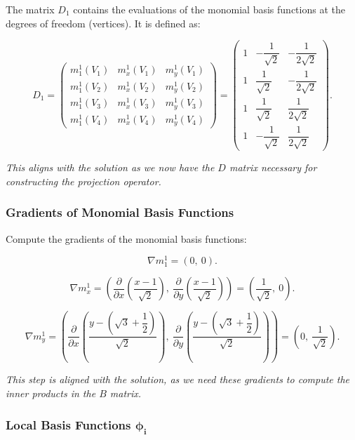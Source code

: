 \documentclass[class=article, crop=false]{standalone}
\begin{document}
The matrix $D_1$ contains the evaluations of the monomial basis functions at the degrees of freedom (vertices). It is defined as:

\[
D_1 = \begin{pmatrix}
m_1^1(V_1) & m_x^1(V_1) & m_y^1(V_1) \\
m_1^1(V_2) & m_x^1(V_2) & m_y^1(V_2) \\
m_1^1(V_3) & m_x^1(V_3) & m_y^1(V_3) \\
m_1^1(V_4) & m_x^1(V_4) & m_y^1(V_4)
\end{pmatrix} = \begin{pmatrix}
1 & -\dfrac{1}{\sqrt{2}} & -\dfrac{1}{2\sqrt{2}} \\
1 & \dfrac{1}{\sqrt{2}} & -\dfrac{1}{2\sqrt{2}} \\
1 & \dfrac{1}{\sqrt{2}} & \dfrac{1}{2\sqrt{2}} \\
1 & -\dfrac{1}{\sqrt{2}} & \dfrac{1}{2\sqrt{2}}
\end{pmatrix}.
\]

\noindent
\textit{This aligns with the solution as we now have the $D$ matrix necessary for constructing the projection operator.}

\subsubsection{Gradients of Monomial Basis Functions}

Compute the gradients of the monomial basis functions:

\[
\nabla m_1^1 = \left( 0,\ 0 \right).
\]

\[
\nabla m_x^1 = \left( \dfrac{\partial}{\partial x} \left( \dfrac{x - 1}{\sqrt{2}} \right),\ \dfrac{\partial}{\partial y} \left( \dfrac{x - 1}{\sqrt{2}} \right) \right) = \left( \dfrac{1}{\sqrt{2}},\ 0 \right).
\]

\[
\nabla m_y^1 = \left( \dfrac{\partial}{\partial x} \left( \dfrac{y - \left( \sqrt{3} + \dfrac{1}{2} \right)}{\sqrt{2}} \right),\ \dfrac{\partial}{\partial y} \left( \dfrac{y - \left( \sqrt{3} + \dfrac{1}{2} \right)}{\sqrt{2}} \right) \right) = \left( 0,\ \dfrac{1}{\sqrt{2}} \right).
\]

\noindent
\textit{This step is aligned with the solution, as we need these gradients to compute the inner products in the $B$ matrix.}

\subsubsection{Local Basis Functions $\boldsymbol{\phi_i}$}
\end{document}
